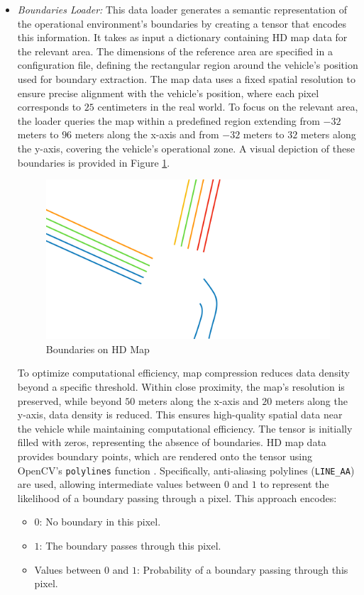 \begin{itemize}
    \item \textit{Boundaries Loader:} This data loader generates a semantic representation of the operational environment's boundaries by creating a tensor that encodes this information. It takes as input a dictionary containing HD map data for the relevant area. The dimensions of the reference area are specified in a configuration file, defining the rectangular region around the vehicle's position used for boundary extraction.
    The map data uses a fixed spatial resolution to ensure precise alignment with the vehicle’s position, where each pixel corresponds to $25$ centimeters in the real world. To focus on the relevant area, the loader queries the map within a predefined region extending from $-32$ meters to $96$ meters along the x-axis and from $-32$ meters to $32$ meters along the y-axis, covering the vehicle’s operational zone. A visual depiction of these boundaries is provided in Figure \ref{fig:hd-map-boundaries}.
    \begin{figure}[H]
        \centering
        \includegraphics[width=0.75\linewidth]{LateX//figs/mappaHD.pdf}
        \caption{Boundaries on HD Map}
        \label{fig:hd-map-boundaries}
    \end{figure}
    To optimize computational efficiency, map compression reduces data density beyond a specific threshold. Within close proximity, the map’s resolution is preserved, while beyond $50$ meters along the x-axis and $20$ meters along the y-axis, data density is reduced. This ensures high-quality spatial data near the vehicle while maintaining computational efficiency.
    The tensor is initially filled with zeros, representing the absence of boundaries.
    HD map data provides boundary points, which are rendered onto the tensor using OpenCV’s \texttt{polylines} function \cite{itseez2015opencv}. Specifically, anti-aliasing polylines (\texttt{LINE\_AA}) are used, allowing intermediate values between $0$ and $1$ to represent the likelihood of a boundary passing through a pixel. This approach encodes:
    \begin{itemize}
        \item $0$: No boundary in this pixel.
        \item $1$: The boundary passes through this pixel.
        \item Values between $0$ and $1$: Probability of a boundary passing through this pixel.
    \end{itemize}
    

\end{itemize}
